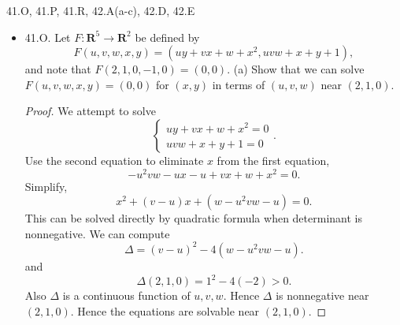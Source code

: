 
41.O, 41.P, 41.R, 42.A(a-c), 42.D, 42.E
\begin{itemize}
	\item 41.O. Let $F: \boldsymbol{R}^5 \rightarrow \boldsymbol{R}^2$ be defined by
\[
F(u, v, w, x, y)=\left(u y+v x+w+x^2, u v w+x+y+1\right),
\]
and note that $F(2,1,0,-1,0)=(0,0)$.
(a) Show that we can solve $F(u, v, w, x, y)=(0,0)$ for $(x, y)$ in terms of $(u, v, w)$ near $(2,1,0)$.
\begin{proof}
	We attempt to solve
	\[
		\begin{cases}
			uy + vx + w + x^2 = 0 \\
			uvw + x + y + 1 = 0
		\end{cases}
	.\] 
	Use the second equation to eliminate $x$ from the first equation,
	\[
		-u^2 vw - ux - u + vx + w + x^2 = 0
	.\] 
	Simplify,
	\[
		x^2 + \left( v - u \right)x + (w - u^2 vw - u)  =0
	.\] 
	This can be solved directly by quadratic formula when determinant is nonnegative. We can compute
	\[
		\Delta = (v-u)^2 - 4\left( w - u^2 vw - u \right) 
	.\] 
	and
	\[
		\Delta(2,1,0) = 1^2 - 4(-2) > 0
	.\] 
	Also $\Delta$ is a continuous function of $u,v,w$. Hence $\Delta$ is nonnegative near $(2,1,0) $. Hence the equations are solvable near $(2,1,0)$.
\end{proof}


\end{itemize}
